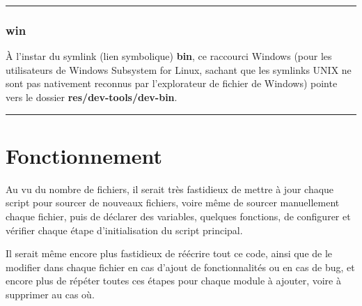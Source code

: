 \documentclass[a4paper,10pt]{article}
\begin{document}

    \color{sec3}\par\noindent\rule{\textwidth}{0.4pt}\color{text}

    \color{sec3}
    \subsubsection{win}\color{text}

    \begin{justify}
        À l'instar du symlink (lien symbolique) \textbf{\color{path}bin}, ce raccourci Windows (pour les utilisateurs de Windows Subsystem for Linux, sachant que les symlinks UNIX ne sont pas nativement reconnus par l'explorateur de fichier de Windows) pointe vers le dossier \textbf{\color{path}res/dev-tools/dev-bin}.
    \end{justify}





    \color{sec1}\par\noindent\rule{\textwidth}{0.4pt}\color{text}

    \color{sec1}
    \section{Fonctionnement}\color{text}

    \begin{justify}
        Au vu du nombre de fichiers, il serait très fastidieux de mettre à jour chaque script pour sourcer de nouveaux fichiers, voire même de sourcer manuellement chaque fichier, puis de déclarer des variables, quelques fonctions, de configurer et vérifier chaque étape d'initialisation du script principal.
    \end{justify}

    \begin{justify}
        Il serait même encore plus fastidieux de réécrire tout ce code, ainsi que de le modifier dans chaque fichier en cas d'ajout de fonctionnalités ou en cas de bug, et encore plus de répéter toutes ces étapes pour chaque module à ajouter, voire à supprimer au cas où.
    \end{justify}
\end{document}
